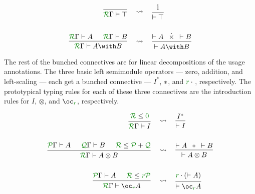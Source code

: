 \begin{align*}
  \begin{prooftree}
    \infer0{\grR\Gamma \vdash \top}
  \end{prooftree}
  &\quad\rightsquigarrow\quad
  \begin{prooftree}
    \set{separation=0.75em}
    \hypo{\dot1}
    \infer1{\vdash \top}
  \end{prooftree}
  \\\\
  \begin{prooftree}
    \hypo{\grR\Gamma \vdash A}
    \hypo{\grR\Gamma \vdash B}
    \infer2{\grR\Gamma \vdash A \with B}
  \end{prooftree}
  &\quad\rightsquigarrow\quad
  \begin{prooftree}
    \set{separation=0.75em}
    \hypo{\vdash A}
    \hypo{\dottimes}
    \hypo{\vdash B}
    \infer3{\vdash A \with B}
  \end{prooftree}
\end{align*}

The rest of the bunched connectives are for linear decompositions of the usage
annotations.
The three basic left semimodule operators --- zero, addition, and left-scaling
--- each get a bunched connective --- $I^*$, $\mathbin{*}$, and $\gr r \cdot {}$,
respectively.
The prototypical typing rules for each of these three connectives are the
introduction rules for $I$, $\otimes$, and $\oc_{\gr r}$, respectively.

\begin{align*}
  \begin{prooftree}
    \hypo{\grR \leq \gr0}
    \infer1{\grR\Gamma \vdash I}
  \end{prooftree}
  &\quad\rightsquigarrow\quad
  \begin{prooftree}
    \set{separation=0.75em}
    \hypo{I^*}
    \infer1{\vdash I}
  \end{prooftree}
  \\\\
  \begin{prooftree}
    \hypo{\grP\Gamma \vdash A}
    \hypo{\grQ\Gamma \vdash B}
    \hypo{\grR \leq \grP + \grQ}
    \infer3{\grR\Gamma \vdash A \otimes B}
  \end{prooftree}
  &\quad\rightsquigarrow\quad
  \begin{prooftree}
    \set{separation=0.75em}
    \hypo{\vdash A}
    \hypo{\sep}
    \hypo{\vdash B}
    \infer3{\vdash A \otimes B}
  \end{prooftree}
  \\\\
  \begin{prooftree}
    \hypo{\grP\Gamma \vdash A}
    \hypo{\grR \leq \gr r\grP}
    \infer2{\grR\Gamma \vdash \oc_{\gr r} A}
  \end{prooftree}
  &\quad\rightsquigarrow\quad
  \begin{prooftree}
    \set{separation=0.75em}
    \hypo{\gr r \cdot (\vdash A)}
    \infer1{\vdash \oc_{\gr r} A}
  \end{prooftree}
\end{align*}

